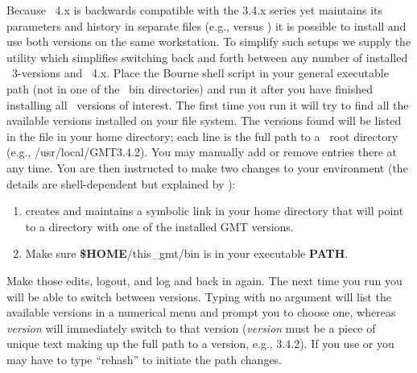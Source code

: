 Because \GMT\ 4.x is backwards compatible with the 3.4.x series yet maintains its parameters
and history in separate files (e.g.,  versus )
it is possible to install and use both versions on the same workstation.  To simplify such
setups we supply the utility  which simplifies switching back and forth
between any number of installed \GMT\ 3-versions and \GMT\ 4.x.  Place the  Bourne
shell script in your
general executable path (not in one of the \GMT\ bin directories) and run it after you have
finished installing all \GMT\ versions of interest.  The first time you run 
it will try to find all the available versions installed on your file system.  The versions
found will be listed in the file  in your home directory; each line
is the full path to a \GMT\ root directory (e.g., /usr/local/GMT3.4.2).  You may
manually add or remove entries there at any time.  You are then instructed to make two
changes to your environment (the details are shell-dependent but explained by ):
\begin{enumerate}
\item {} creates and maintains a symbolic link  in your home
directory that will point to a directory with one of the installed GMT versions.
\item Make sure {\bf \$HOME}/this\_gmt/bin is in your executable \textbf{PATH}.
\end{enumerate}
Make those edits, logout, and log and back in again.  The next time you run 
you will be able to switch between versions.  Typing  with no argument will list the
available versions in a numerical menu and prompt you to choose one, whereas  {\it version}
will immediately switch to that version ({\it version} must be a piece of unique text making
up the full path to a version, e.g., 3.4.2).  If you use  or  you may have to type
``rehash'' to initiate the path changes.
